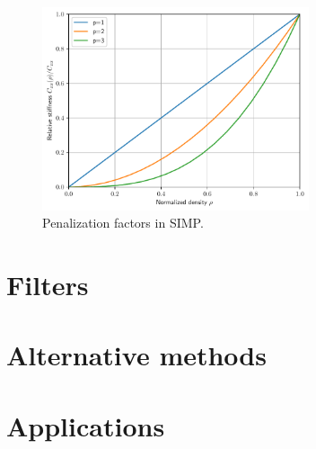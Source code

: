 \begin{figure}
    \centering
    \includegraphics[width=0.7\textwidth]{figures/simp.pdf}
    \caption{Penalization factors in SIMP.}
    \label{fig:simp}
\end{figure}




\section{Filters}



\section{Alternative methods}


\section{Applications}
